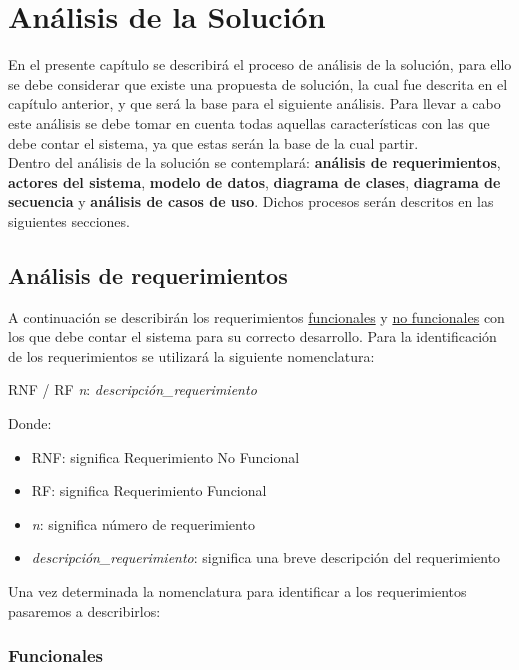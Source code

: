 \hypertarget{cv:analisisSol
	ucion}{
	\chapter{Análisis de la Solución}
}

En el presente capítulo se describirá el proceso de análisis de la solución, para ello se debe considerar que existe una propuesta de solución, la cual fue descrita en el capítulo anterior, y que será la base para el siguiente análisis. Para llevar a cabo este análisis se debe tomar en cuenta todas aquellas características con las que debe contar el sistema, ya que estas serán la base de la cual partir. \\ 

Dentro del análisis de la solución se contemplará: \textbf{análisis de requerimientos}, \textbf{actores del sistema}, \textbf{modelo de datos}, \textbf{diagrama de clases}, \textbf{diagrama de secuencia} y \textbf{análisis de casos de uso}. Dichos procesos serán descritos en las siguientes secciones.

\section{Análisis de requerimientos}
A continuación se describirán los requerimientos \hyperlink{cv:funcionales}{funcionales} y \hyperlink{cv:noFuncionales}{no funcionales} con los que debe contar el sistema para su correcto desarrollo. Para la identificación de los requerimientos se utilizará la siguiente nomenclatura: 

\begin{center}
\Huge{RNF / RF \textit{n}: \textit{descripción\_requerimiento}}
\end{center} 

Donde: 

\begin{itemize}
	\item RNF: significa Requerimiento No Funcional
	\item RF: significa Requerimiento Funcional
	\item \textit{n}: significa número de requerimiento
	\item \textit{descripción\_requerimiento}: significa una breve descripción del requerimiento
\end{itemize}

Una vez determinada la nomenclatura para identificar a los requerimientos pasaremos a describirlos: 
\hypertarget{cv:funcionales}{\subsection{Funcionales}}

